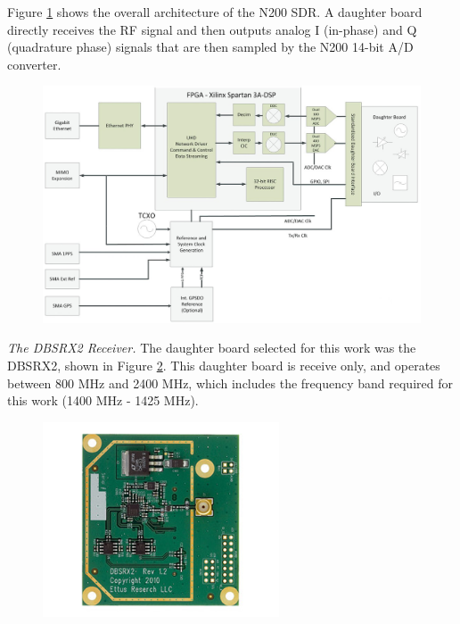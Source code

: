 Figure \ref{N200_block} shows the overall architecture of the N200 SDR.  A daughter board directly receives the RF signal and then outputs analog I (in-phase) and Q (quadrature phase) signals that are then sampled by the N200 14-bit  A/D converter.

{\begin{figure}[h!tb] 
\centering
\includegraphics[width=14cm]{Images/n200_block_edited}
\label{N200_block}
\end{figure}
}

\emph{The DBSRX2 Receiver.}  The daughter board selected for this work was the DBSRX2, shown in Figure \ref{dbsrx2}.  This daughter board is receive only, and operates between 800 MHz and 2400 MHz, which includes the frequency band required for this work (1400 MHz - 1425 MHz).

{\begin{figure}[h!tb] 
\centering
\includegraphics[width=7cm]{Images/dbsrx2.jpg}
\label{dbsrx2}
\end{figure}
}

